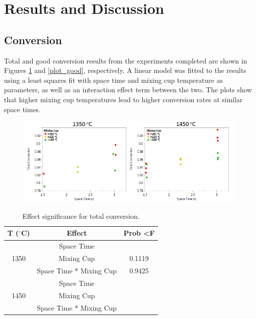 \documentclass[11pt,twocolumn]{article}
\begin{document}
\section*{Results and Discussion}

\subsection*{Conversion}

Total and good conversion results from the experiments completed are shown in Figures \ref{plot_total} and \ref{plot_good},
respectively. A linear model was fitted to the results using a least squares fit with space time and
mixing cup temperature as parameters, as well as
an interaction effect term between the two. The
plots show that higher mixing cup temperatures
lead to higher conversion rates at similar space
times.

\begin{figure}
	\centering
	\includegraphics[width = \textwidth]{x_tot.png}
	\caption{}
	\label{plot_total}
\end{figure}

\begin{table}
	\centering
	\caption{Effect significance for total conversion.}
	\label{tbl_total}
	\begin{tabular}{|c|c|c|}
	\hline
	T ($^\circ$C)			&	Effect				&	Prob \textless F	\\
	\hline
	\multirow{3}{*}{1350}	&	Space Time			&	\color{red}{0.0176} \\
	{}					&	Mixing Cup			&	0.1119 \\
	{}					&	Space Time * Mixing Cup	&	0.9425 \\
	\hline
	\multirow{3}{*}{1450}	&	Space Time			&	\color{red}{\textless 0.0001} \\
	{}					&	Mixing Cup			&	\color{red}{0.0018} \\
	{}					&	Space Time * Mixing Cup	&	\color{red}{0.0159} \\	
	\hline
	\end{tabular}
\end{table}
\end{document}
